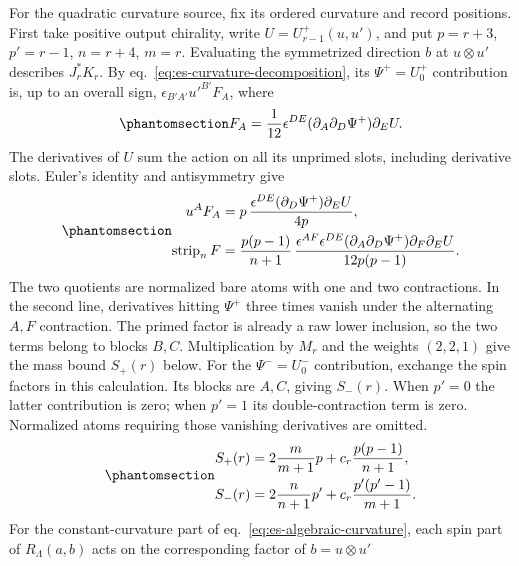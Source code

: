 \documentclass[
  english,
  11pt,
  reqno]{amsart}
\begin{document}
For the quadratic curvature source, fix its ordered curvature and record
positions. First take positive output chirality, write
\(U=U_{r-1}^+(u,u')\), and put \(p=r+3\), \(p'=r-1\), \(n=r+4\),
\(m=r\). Evaluating the symmetrized direction \(b\) at \(u\otimes u'\)
describes \(J_r^*K_r\). By eq.~\ref{eq:es-curvature-decomposition}, its
\(\Psi^+=U_0^+\) contribution is, up to an overall sign,
\(\epsilon_{B'A'}u'^{B'}F_A\), where
\begin{equation}\protect\phantomsection\label{eq:es-source-weyl-polynomial}{
 F_A=\frac1{12}\epsilon^{DE}
                  (\partial_A\partial_D\Psi^+)\partial_EU.
}\end{equation} The derivatives of \(U\) sum the action on all its
unprimed slots, including derivative slots. Euler's identity and
antisymmetry give
\begin{equation}\protect\phantomsection\label{eq:es-source-normalized-atoms}{
 \begin{aligned}
 u^AF_A
 &=p\,\frac{\epsilon^{DE}(\partial_D\Psi^+)\partial_EU}{4p},\\
 \operatorname{strip}_nF
 &=\frac{p(p-1)}{n+1}\,
   \frac{\epsilon^{AF}\epsilon^{DE}
       (\partial_A\partial_D\Psi^+)\partial_F\partial_EU}
        {12p(p-1)}.
 \end{aligned}
}\end{equation} The two quotients are normalized bare atoms with one and
two contractions. In the second line, derivatives hitting \(\Psi^+\)
three times vanish under the alternating \(A,F\) contraction. The primed
factor is already a raw lower inclusion, so the two terms belong to
blocks \(B,C\). Multiplication by \(M_r\) and the weights \((2,2,1)\)
give the mass bound \(S_+(r)\) below. For the \(\Psi^-=U_0^-\)
contribution, exchange the spin factors in this calculation. Its blocks
are \(A,C\), giving \(S_-(r)\). When \(p'=0\) the latter contribution is
zero; when \(p'=1\) its double-contraction term is zero. Normalized
atoms requiring those vanishing derivatives are omitted.
\begin{equation}\protect\phantomsection\label{eq:es-source-weyl-masses}{
 \begin{aligned}
 S_+(r)&=2\frac{m}{m+1}p+c_r\frac{p(p-1)}{n+1},\\
 S_-(r)&=2\frac{n}{n+1}p'+c_r\frac{p'(p'-1)}{m+1}.
 \end{aligned}
}\end{equation} For the constant-curvature part of
eq.~\ref{eq:es-algebraic-curvature}, each spin part of
\(R_\Lambda(a,b)\) acts on the corresponding factor of \(b=u\otimes u'\)
\end{document}
